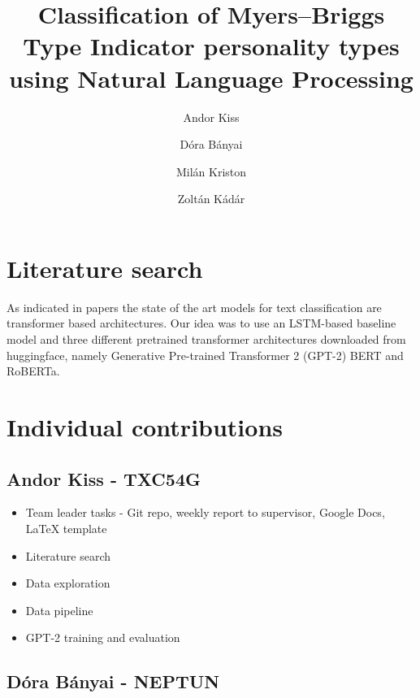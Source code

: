 \documentclass[runningheads]{llncs}
\begin{document}
%
\title{Classification of Myers–Briggs Type Indicator personality types using Natural Language Processing}
%
%
\author{Andor Kiss \and
Dóra Bányai \and
Milán Kriston \and
Zoltán Kádár}
%
%
%
\maketitle              %
%

%
%
%
\section{Literature search}

As indicated in papers \cite{DL_text_class} \cite{MBTI_class} the state of the art models for text classification are transformer based architectures. Our idea was to use an LSTM-based baseline model and three different pretrained transformer architectures downloaded from huggingface, namely Generative Pre-trained Transformer 2 (GPT-2) \cite{gpt2} BERT and RoBERTa.

\section{Individual contributions}

\subsection{Andor Kiss - TXC54G}

\begin{itemize}
  \item Team leader tasks - Git repo, weekly report to supervisor, Google Docs, LaTeX template
  \item Literature search
  \item Data exploration
  \item Data pipeline
  \item GPT-2 training and evaluation
\end{itemize}

\subsection{Dóra Bányai - NEPTUN}
\end{document}
